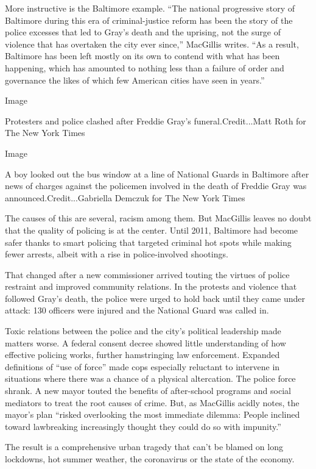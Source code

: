 More instructive is the Baltimore example. ``The national progressive
story of Baltimore during this era of criminal-justice reform has been
the story of the police excesses that led to Gray's death and the
uprising, not the surge of violence that has overtaken the city ever
since,'' MacGillis writes. ``As a result, Baltimore has been left mostly
on its own to contend with what has been happening, which has amounted
to nothing less than a failure of order and governance the likes of
which few American cities have seen in years.''

Image

Protesters and police clashed after Freddie Gray's funeral.Credit...Matt
Roth for The New York Times

Image

A boy looked out the bus window at a line of National Guards in
Baltimore after news of charges against the policemen involved in the
death of Freddie Gray was announced.Credit...Gabriella Demczuk for The
New York Times

The causes of this are several, racism among them. But MacGillis leaves
no doubt that the quality of policing is at the center. Until 2011,
Baltimore had become safer thanks to smart policing that targeted
criminal hot spots while making fewer arrests, albeit with a rise in
police-involved shootings.

That changed after a new commissioner arrived touting the virtues of
police restraint and improved community relations. In the protests and
violence that followed Gray's death, the police were urged to hold back
until they came under attack: 130 officers were injured and the National
Guard was called in.

Toxic relations between the police and the city's political leadership
made matters worse. A federal consent decree showed little understanding
of how effective policing works, further hamstringing law enforcement.
Expanded definitions of ``use of force'' made cops especially reluctant
to intervene in situations where there was a chance of a physical
altercation. The police force shrank. A new mayor touted the benefits of
after-school programs and social mediators to treat the root causes of
crime. But, as MacGillis acidly notes, the mayor's plan ``risked
overlooking the most immediate dilemma: People inclined toward
lawbreaking increasingly thought they could do so with impunity.''

The result is a comprehensive urban tragedy that can't be blamed on long
lockdowns, hot summer weather, the coronavirus or the state of the
economy.

